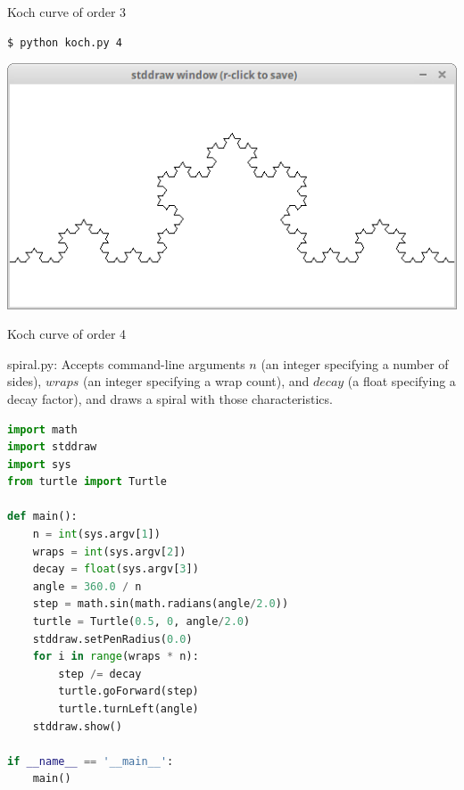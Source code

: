\documentclass[8pt,a4paper,compress,handout]{beamer}
\begin{document}
\begin{frame}[fragile]
\begin{minipage}{100pt}
\begin{center}
\smallskip

\tiny Koch curve of order 3
\end{center}
\end{minipage}%

\bigskip

\begin{minipage}{200pt}
\begin{lstlisting}[language={}]
$ python koch.py 4
\end{lstlisting}
\end{minipage}%
\hfill
\begin{minipage}{100pt}
\begin{center}
\includegraphics[scale=0.12]{figures/koch5.png}

\smallskip

\tiny Koch curve of order 4
\end{center}
\end{minipage}
\end{frame}

\begin{frame}[fragile]
\begin{framed}
\tiny spiral.py: Accepts command-line arguments $n$ (an integer specifying a number  of sides), $wraps$ (an integer specifying a wrap count), and $decay$ (a float specifying a decay factor), and draws a spiral with those characteristics.
\end{framed}

\begin{lstlisting}[language=Python]
import math
import stddraw
import sys
from turtle import Turtle

def main():
    n = int(sys.argv[1])
    wraps = int(sys.argv[2])
    decay = float(sys.argv[3])
    angle = 360.0 / n
    step = math.sin(math.radians(angle/2.0))
    turtle = Turtle(0.5, 0, angle/2.0)
    stddraw.setPenRadius(0.0)
    for i in range(wraps * n):
        step /= decay
        turtle.goForward(step)
        turtle.turnLeft(angle)
    stddraw.show()
    
if __name__ == '__main__':
    main()
\end{lstlisting}
\end{frame}
\end{document}
